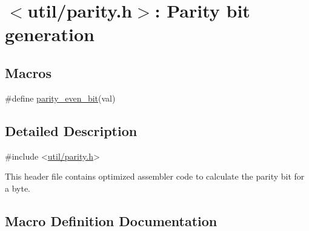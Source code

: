 \hypertarget{group__util__parity}{}\section{$<$util/parity.h$>$\+: Parity bit generation}
\label{group__util__parity}
\subsection*{Macros}
\begin{DoxyCompactItemize}
\item 
\#define \hyperlink{group__util__parity_ga4180eaa9b8f27f8efc589f3a3ba1724c}{parity\+\_\+even\+\_\+bit}(val)
\end{DoxyCompactItemize}


\subsection{Detailed Description}

\begin{DoxyCode}
\textcolor{preprocessor}{#include <\hyperlink{util_2parity_8h}{util/parity.h}>} 
\end{DoxyCode}


This header file contains optimized assembler code to calculate the parity bit for a byte. 

\subsection{Macro Definition Documentation}
